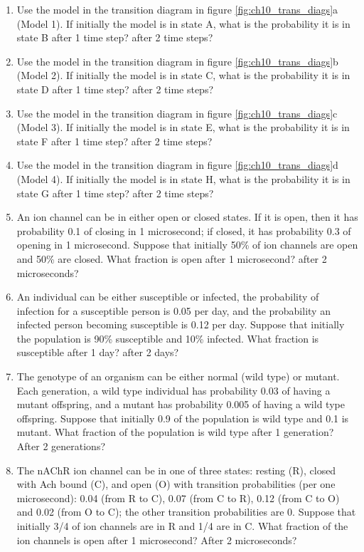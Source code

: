 \documentclass[
]{book}
\theoremstyle{definition}
\theoremstyle{definition}
\theoremstyle{definition}
\theoremstyle{remark}
\begin{document}
\begin{enumerate}
\def\labelenumi{\arabic{enumi}.}
\item
  Use the model in the transition diagram in figure \ref{fig:ch10_trans_diags}a (Model 1). If initially the model is in state A, what is the probability it is in state B after 1 time step? after 2 time steps?
\item
  Use the model in the transition diagram in figure \ref{fig:ch10_trans_diags}b (Model 2). If initially the model is in state C, what is the probability it is in state D after 1 time step? after 2 time steps?
\item
  Use the model in the transition diagram in figure \ref{fig:ch10_trans_diags}c (Model 3). If initially the model is in state E, what is the probability it is in state F after 1 time step? after 2 time steps?
\item
  Use the model in the transition diagram in figure \ref{fig:ch10_trans_diags}d (Model 4). If initially the model is in state H, what is the probability it is in state G after 1 time step? after 2 time steps?
\item
  An ion channel can be in either open or closed states. If it is open, then it has probability 0.1 of closing in 1 microsecond; if closed, it has probability 0.3 of opening in 1 microsecond. Suppose that initially 50\% of ion channels are open and 50\% are closed. What fraction is open after 1 microsecond? after 2 microseconds?
\item
  An individual can be either susceptible or infected, the probability of infection for a susceptible person is 0.05 per day, and the probability an infected person becoming susceptible is 0.12 per day. Suppose that initially the population is 90\% susceptible and 10\% infected. What fraction is susceptible after 1 day? after 2 days?
\item
  The genotype of an organism can be either normal (wild type) or mutant. Each generation, a wild type individual has probability 0.03 of having a mutant offspring, and a mutant has probability 0.005 of having a wild type offspring. Suppose that initially 0.9 of the population is wild type and 0.1 is mutant. What fraction of the population is wild type after 1 generation? After 2 generations?
\item
  The nAChR ion channel can be in one of three states: resting (R), closed with Ach bound (C), and open (O) with transition probabilities (per one microsecond): 0.04 (from R to C), 0.07 (from C to R), 0.12 (from C to O) and 0.02 (from O to C); the other transition probabilities are 0. Suppose that initially 3/4 of ion channels are in R and 1/4 are in C. What fraction of the ion channels is open after 1 microsecond? After 2 microseconds?

\end{enumerate}
\end{document}
